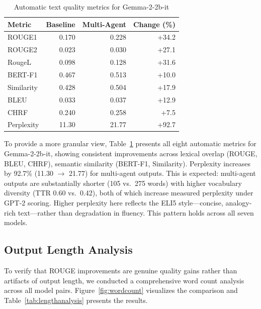 \begin{table}[h]
\centering
\caption{Automatic text quality metrics for Gemma-2-2b-it}
\label{tab:textquality}
\begin{tabular}{lrrr}
\toprule
\textbf{Metric} & \textbf{Baseline} & \textbf{Multi-Agent} & \textbf{Change (\%)} \\
\midrule
ROUGE1 & 0.170 & 0.228 & +34.2 \\
ROUGE2 & 0.023 & 0.030 & +27.1 \\
RougeL & 0.098 & 0.128 & +31.6 \\
BERT-F1 & 0.467 & 0.513 & +10.0 \\
Similarity & 0.428 & 0.504 & +17.9 \\
BLEU & 0.033 & 0.037 & +12.9 \\
CHRF & 0.240 & 0.258 & +7.5 \\
Perplexity & 11.30 & 21.77 & +92.7 \\
\bottomrule
\end{tabular}
\end{table}

To provide a more granular view, Table~\ref{tab:textquality} presents all eight automatic metrics for Gemma-2-2b-it, showing consistent improvements across lexical overlap (ROUGE, BLEU, CHRF), semantic similarity (BERT-F1, Similarity). Perplexity increases by 92.7\% (11.30 $\rightarrow$ 21.77) for multi-agent outputs. This is expected: multi-agent outputs are substantially shorter (105 vs.\ 275 words) with higher vocabulary diversity (TTR 0.60 vs.\ 0.42), both of which increase measured perplexity under GPT-2 scoring. Higher perplexity here reflects the ELI5 style---concise, analogy-rich text---rather than degradation in fluency. This pattern holds across all seven models.

\subsection{Output Length Analysis}



To verify that ROUGE improvements are genuine quality gains rather than artifacts of output length, we conducted a comprehensive word count analysis across all model pairs. Figure~\ref{fig:wordcount} visualizes the comparison and Table~\ref{tab:lengthanalysis} presents the results.

